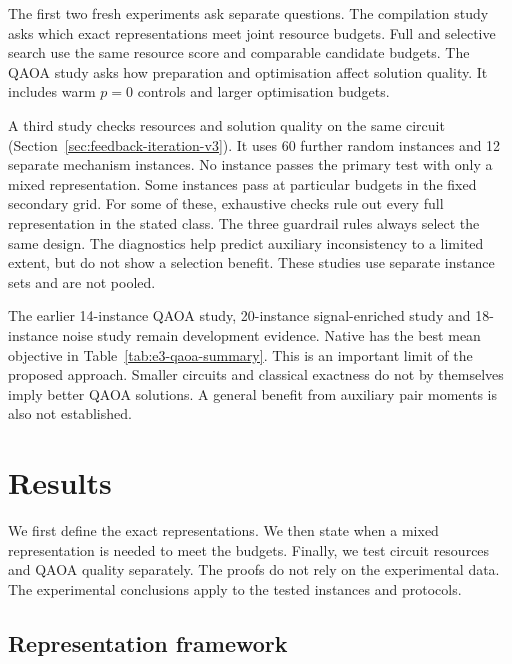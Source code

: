 \documentclass[a4paper,onecolumn,11pt,unpublished]{quantumarticle}
\theoremstyle{remark}
\begin{document}
The first two fresh experiments ask separate questions. The compilation study asks
which exact representations meet joint resource budgets. Full and selective
search use the same resource score and comparable candidate budgets.
The QAOA study asks how preparation and optimisation affect solution quality.
It includes warm $p=0$ controls and larger optimisation budgets.

A third study checks resources and solution quality on the same circuit
(Section~\ref{sec:feedback-iteration-v3}). It uses 60 further random instances
and 12 separate mechanism instances. No instance passes the primary test
with only a mixed representation. Some instances pass at particular budgets
in the fixed secondary grid. For some of these, exhaustive checks rule out
every full representation in the stated class. The three guardrail rules
always select the same design. The diagnostics help predict auxiliary
inconsistency to a limited extent, but do not show a selection benefit.
These studies use separate instance sets and are not pooled.

The earlier 14-instance QAOA study, 20-instance signal-enriched study and
18-instance noise study remain development evidence. Native has the best
mean objective in Table~\ref{tab:e3-qaoa-summary}. This is an important limit
of the proposed approach. Smaller circuits and classical exactness do not
by themselves imply better QAOA solutions. A general benefit from auxiliary
pair moments is also not established.

\section{Results}
\label{sec:results}

We first define the exact representations. We then state when a mixed
representation is needed to meet the budgets. Finally, we test circuit
resources and QAOA quality separately. The proofs do not rely on the
experimental data. The experimental conclusions apply to the tested
instances and protocols.

\subsection{Representation framework}
\label{sec:preliminaries}
\label{sec:pb-diagonal}
\label{sec:pointwise-exactness}
\label{sec:resource-relaxation-data}
\end{document}
